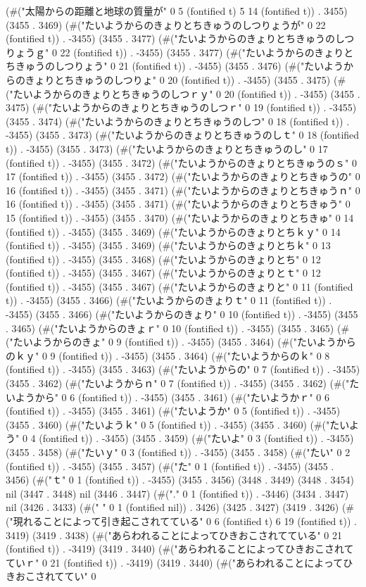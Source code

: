 (#("太陽からの距離と地球の質量が" 0 5 (fontified t) 5 14 (fontified t)) . 3455) (3455 . 3469) (#("たいようからのきょりとちきゅうのしつりょうが" 0 22 (fontified t)) . -3455) (3455 . 3477) (#("たいようからのきょりとちきゅうのしつりょうｇ" 0 22 (fontified t)) . -3455) (3455 . 3477) (#("たいようからのきょりとちきゅうのしつりょう" 0 21 (fontified t)) . -3455) (3455 . 3476) (#("たいようからのきょりとちきゅうのしつりょ" 0 20 (fontified t)) . -3455) (3455 . 3475) (#("たいようからのきょりとちきゅうのしつｒｙ" 0 20 (fontified t)) . -3455) (3455 . 3475) (#("たいようからのきょりとちきゅうのしつｒ" 0 19 (fontified t)) . -3455) (3455 . 3474) (#("たいようからのきょりとちきゅうのしつ" 0 18 (fontified t)) . -3455) (3455 . 3473) (#("たいようからのきょりとちきゅうのしｔ" 0 18 (fontified t)) . -3455) (3455 . 3473) (#("たいようからのきょりとちきゅうのし" 0 17 (fontified t)) . -3455) (3455 . 3472) (#("たいようからのきょりとちきゅうのｓ" 0 17 (fontified t)) . -3455) (3455 . 3472) (#("たいようからのきょりとちきゅうの" 0 16 (fontified t)) . -3455) (3455 . 3471) (#("たいようからのきょりとちきゅうｎ" 0 16 (fontified t)) . -3455) (3455 . 3471) (#("たいようからのきょりとちきゅう" 0 15 (fontified t)) . -3455) (3455 . 3470) (#("たいようからのきょりとちきゅ" 0 14 (fontified t)) . -3455) (3455 . 3469) (#("たいようからのきょりとちｋｙ" 0 14 (fontified t)) . -3455) (3455 . 3469) (#("たいようからのきょりとちｋ" 0 13 (fontified t)) . -3455) (3455 . 3468) (#("たいようからのきょりとち" 0 12 (fontified t)) . -3455) (3455 . 3467) (#("たいようからのきょりとｔ" 0 12 (fontified t)) . -3455) (3455 . 3467) (#("たいようからのきょりと" 0 11 (fontified t)) . -3455) (3455 . 3466) (#("たいようからのきょりｔ" 0 11 (fontified t)) . -3455) (3455 . 3466) (#("たいようからのきょり" 0 10 (fontified t)) . -3455) (3455 . 3465) (#("たいようからのきょｒ" 0 10 (fontified t)) . -3455) (3455 . 3465) (#("たいようからのきょ" 0 9 (fontified t)) . -3455) (3455 . 3464) (#("たいようからのｋｙ" 0 9 (fontified t)) . -3455) (3455 . 3464) (#("たいようからのｋ" 0 8 (fontified t)) . -3455) (3455 . 3463) (#("たいようからの" 0 7 (fontified t)) . -3455) (3455 . 3462) (#("たいようからｎ" 0 7 (fontified t)) . -3455) (3455 . 3462) (#("たいようから" 0 6 (fontified t)) . -3455) (3455 . 3461) (#("たいようかｒ" 0 6 (fontified t)) . -3455) (3455 . 3461) (#("たいようか" 0 5 (fontified t)) . -3455) (3455 . 3460) (#("たいようｋ" 0 5 (fontified t)) . -3455) (3455 . 3460) (#("たいよう" 0 4 (fontified t)) . -3455) (3455 . 3459) (#("たいよ" 0 3 (fontified t)) . -3455) (3455 . 3458) (#("たいｙ" 0 3 (fontified t)) . -3455) (3455 . 3458) (#("たい" 0 2 (fontified t)) . -3455) (3455 . 3457) (#("た" 0 1 (fontified t)) . -3455) (3455 . 3456) (#("ｔ" 0 1 (fontified t)) . -3455) (3455 . 3456) (3448 . 3449) (3448 . 3454) nil (3447 . 3448) nil (3446 . 3447) (#("." 0 1 (fontified t)) . -3446) (3434 . 3447) nil (3426 . 3433) (#(" " 0 1 (fontified nil)) . 3426) (3425 . 3427) (3419 . 3426) (#("現れることによって引き起こされてている" 0 6 (fontified t) 6 19 (fontified t)) . 3419) (3419 . 3438) (#("あらわれることによってひきおこされてている" 0 21 (fontified t)) . -3419) (3419 . 3440) (#("あらわれることによってひきおこされてていｒ" 0 21 (fontified t)) . -3419) (3419 . 3440) (#("あらわれることによってひきおこされててい" 0 